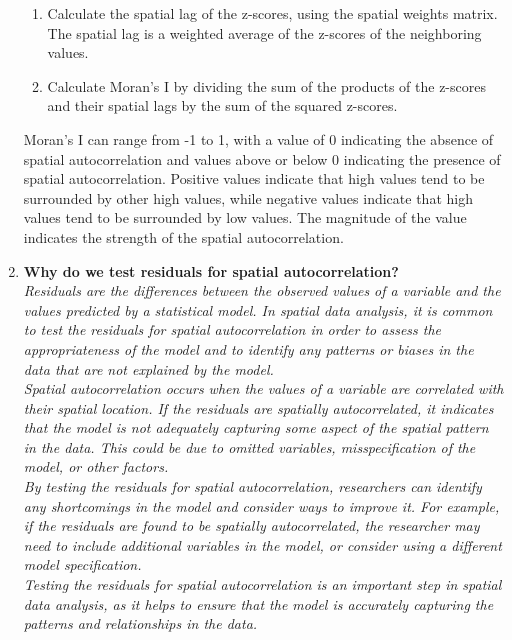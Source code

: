 \documentclass{article}
\begin{document}
\begin{enumerate}
{\begin{enumerate}
    \item Calculate the spatial lag of the z-scores, using the spatial weights matrix. The spatial lag is a weighted average of the z-scores of the neighboring values.
    \item Calculate Moran's I by dividing the sum of the products of the z-scores and their spatial lags by the sum of the squared z-scores.
\end{enumerate}
    Moran's I can range from -1 to 1, with a value of 0 indicating the absence of spatial autocorrelation and values above or below 0 indicating the presence of spatial autocorrelation. Positive values indicate that high values tend to be surrounded by other high values, while negative values indicate that high values tend to be surrounded by low values. The magnitude of the value indicates the strength of the spatial autocorrelation.}
    \item \textbf{Why do we test residuals for spatial autocorrelation?} \\
    \textit{Residuals are the differences between the observed values of a variable and the values predicted by a statistical model. In spatial data analysis, it is common to test the residuals for spatial autocorrelation in order to assess the appropriateness of the model and to identify any patterns or biases in the data that are not explained by the model.\\
    Spatial autocorrelation occurs when the values of a variable are correlated with their spatial location. If the residuals are spatially autocorrelated, it indicates that the model is not adequately capturing some aspect of the spatial pattern in the data. This could be due to omitted variables, misspecification of the model, or other factors.\\
    By testing the residuals for spatial autocorrelation, researchers can identify any shortcomings in the model and consider ways to improve it. For example, if the residuals are found to be spatially autocorrelated, the researcher may need to include additional variables in the model, or consider using a different model specification.\\
    Testing the residuals for spatial autocorrelation is an important step in spatial data analysis, as it helps to ensure that the model is accurately capturing the patterns and relationships in the data.}
\end{enumerate}
\end{document}
